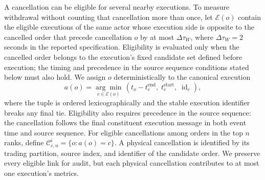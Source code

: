 \documentclass[11pt]{article}
\newenvironment{review}{\begingroup\color{blue}}{\endgroup}
\begin{document}
A cancellation can be eligible for several nearby executions. To measure withdrawal without counting that
cancellation more than once, let $\mathcal E(o)$ contain \begin{review}the eligible executions of the same actor whose execution side is opposite to the cancelled order\end{review} that precede
cancellation $o$ by at most $\Delta\tau_W$, where $\Delta\tau_W=2$ seconds in the reported specification. Eligibility is
evaluated only when the cancelled order belongs to \begin{review}the execution's fixed candidate set defined before execution\end{review}; the timing and
\begin{review}precedence in the source sequence\end{review} conditions stated below must also hold. We assign $o$ deterministically to the canonical execution
\begin{equation}
    a(o)=\underset{c\in\mathcal E(o)}{\arg\min}\,
    \left(t_o-t_c^{\mathrm{end}},\;t_c^{\mathrm{start}},\;\operatorname{id}_c\right),
    \label{eq:canonical_cancel_assignment}
\end{equation}
where the tuple is ordered lexicographically and the stable execution identifier breaks any final tie. Eligibility also
requires \begin{review}precedence in the source sequence\end{review}: the cancellation follows the final constituent execution message in both event time and source
sequence. For \begin{review}eligible cancellations among orders in the top $n$ ranks\end{review}, define $\mathcal{C}_{c,n}^{i}=\{o:a(o)=c\}$. A physical cancellation is
identified by its trading partition, source index, and \begin{review}identifier of the candidate order\end{review}. We preserve every eligible link for
audit, but each physical cancellation contributes to at most one execution's metrics.
\end{document}
